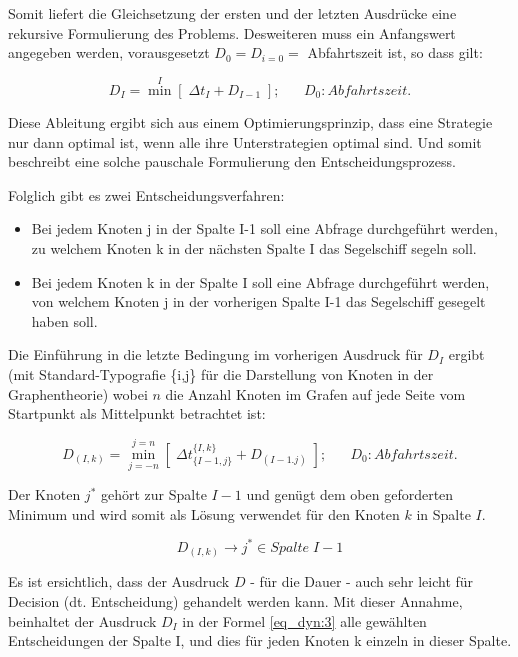 \documentclass[a4paper,10pt]{article}
\begin{document}
Somit liefert die Gleichsetzung der ersten und der letzten Ausdrücke eine rekursive
Formulierung des Problems. Desweiteren muss ein Anfangswert angegeben werden,
vorausgesetzt \(D_0  = D_{i=0} =\) Abfahrtszeit ist, so dass gilt:
 
 \begin{equation}
\label{eq_dyn:3}
D_I =  \overset{I}{\min} [\; \Delta t_I + D_{I-1} \;];\;\;\;\;\;\; D_0: Abfahrtszeit.
 \end{equation}
 
Diese Ableitung ergibt sich aus einem Optimierungsprinzip, dass eine
Strategie nur dann optimal ist, wenn alle ihre Unterstrategien optimal
sind. Und somit beschreibt eine solche pauschale Formulierung den
Entscheidungsprozess. 
 
Folglich gibt es zwei Entscheidungsverfahren:

\begin{itemize}
\item Bei jedem Knoten j in der Spalte I-1 soll eine Abfrage durchgeführt
werden, zu welchem Knoten k in der nächsten Spalte I das Segelschiff segeln
soll.
\item Bei jedem Knoten k in der Spalte I soll eine Abfrage durchgeführt werden,
von welchem Knoten j in der vorherigen Spalte I-1 das Segelschiff gesegelt
haben soll.
\end{itemize}

Die Einführung in die letzte Bedingung im vorherigen Ausdruck für \(D_I\)
ergibt (mit Standard-Typografie \{i,j\}  für die Darstellung von Knoten in der
Graphentheorie) wobei $n$ die Anzahl Knoten im Grafen auf jede Seite vom
Startpunkt als Mittelpunkt betrachtet ist:

\begin{equation}
\label{eq_dyn:4}
D_{(I,k)} = \overset{j=n}{\underset{j=-n}{\min}} [\; \Delta t_{\{I-1,j\}}^{\{I,k\}} + D_{(I-1.j)} \;];\;\;\;\;\;\; D_0: Abfahrtszeit.
\end{equation}

Der Knoten $j^*$ gehört zur Spalte $I-1$ und genügt dem oben geforderten
Minimum und wird somit als Lösung verwendet für den Knoten $k$ in Spalte $I$.

\begin{equation}
\label{eq_dyn:5}
D_{(I,k)} \to j^* \in Spalte\; I-1
\end{equation}
 
Es ist ersichtlich, dass der Ausdruck \(D\) - für die Dauer - auch sehr leicht
für Decision (dt. Entscheidung) gehandelt werden kann. Mit dieser Annahme,
beinhaltet der Ausdruck \(D_I\) in der Formel \eqref{eq_dyn:3} alle gewählten
Entscheidungen der Spalte I, und dies für jeden Knoten k einzeln in dieser
Spalte.
\end{document}
